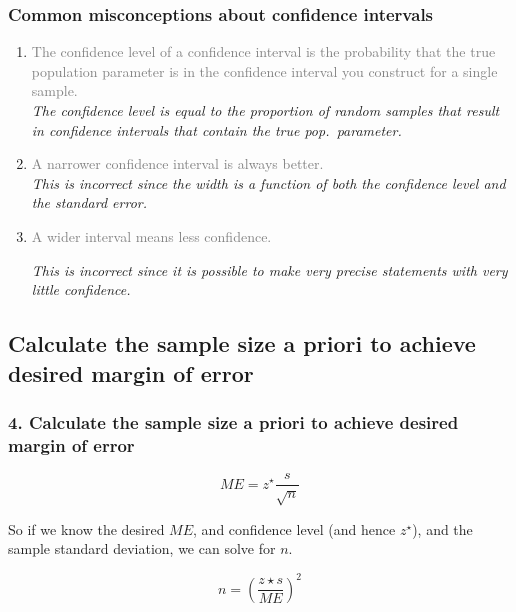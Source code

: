 \documentclass[slidestop,compress,mathserif,11pt,t,professionalfonts,xcolor=table]{beamer}
\begin{document}
\begin{frame}
\frametitle{Common misconceptions about confidence intervals}

\begin{enumerate}

\item \textcolor{gray}{The confidence level of a confidence interval is the
probability that the true population parameter is in the confidence
interval you construct for a single sample.} \\ \pause
\textit{The confidence level is equal to the proportion of random samples that result
in confidence intervals that contain the true pop.\ parameter.} \\

\pause

\item \textcolor{gray}{A narrower confidence interval is always better.}\\ \pause
\textit{This is incorrect since the width is a function of both the confidence level and 
the standard error.} \\

\pause

\item \textcolor{gray}{A wider interval means less confidence.} \\ \pause

\textit{This is incorrect since it is possible to make very precise statements with very 
little confidence.} \\

\end{enumerate}
 
\end{frame}


\subsection{Calculate the sample size a priori to achieve desired margin of error}
\label{mi4}


\begin{frame}
\frametitle{4. Calculate the sample size a priori to achieve desired margin of error}

\vfill

\[ ME = z^\star \frac{s}{\sqrt{n}} \]

So if we know the desired $ME$, and confidence level (and hence $z^\star$),
and the sample standard deviation, we can solve for $n$.  \pause

\[n =  (\frac {z \star s}{ME})^2 \] 

\vfill
 
\end{frame}
\end{document}
